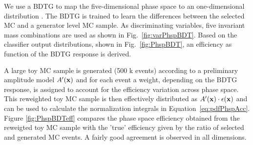 \clearpage 
\noindent We use a BDTG to map the five-dimensional phase space to an one-dimensional distribution \cite{PhysRevLett.121.091801}.
The BDTG is trained to learn the differences between the selected MC and a generator level MC sample.
As discriminating variables, five invariant mass combinations are used as shown in Fig.~\ref{fig:varPhspBDT}.
Based on the classifier output distributions, shown in Fig.~\ref{fig:PhspBDT}, an efficiency as function of the BDTG response is derived.

A large toy MC sample is generated (500 k events) according to a preliminary amplitude model $A^{\prime}(\mathbf{x})$
and for each event a weight, depending on the BDTG response, is assigned
to account for the efficiency variation across phase space.
This reweighted toy MC sample is then effectively distributed as $A^{\prime}(\mathbf{x}) \cdot \epsilon(\mathbf{x})$ and can be used to calculate the normalization integrals in Equation~\ref{eq:pdfPhspAcc}.
Figure \ref{fig:PhspBDTeff} compares the phase space efficiency obtained from the reweigted toy MC sample with the 'true' efficiency 
given by the ratio of selected and generated MC events. 
A fairly good agreement is observed in all dimensions.

